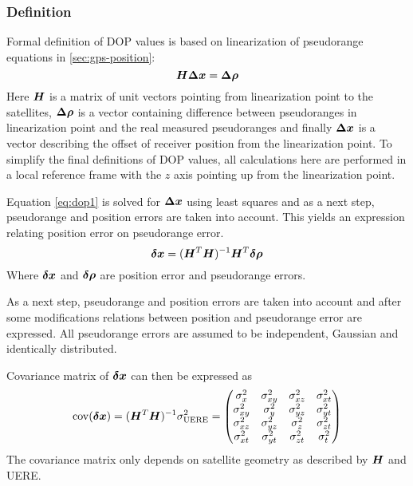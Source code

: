 \subsubsection{Definition}
Formal definition of DOP values is based on linearization of pseudorange equations
in \autoref{sec:gps-position}:
\begin{equation}
	\label{eq:dop1}
	\bm{H}\bm{\Delta x} = \bm{\Delta \rho}
\end{equation}
Here \(\bm{H}\) is a matrix of unit vectors pointing from linearization point
to the satellites, \(\bm{\Delta \rho}\) is a vector containing difference between
pseudoranges in linearization point and the real measured pseudoranges and finally
\(\bm{\Delta x}\) is a vector describing the offset of receiver position from the
linearization point.
To simplify the final definitions of DOP values, all calculations here are performed
in a local reference frame with the \(z\) axis pointing up from the linearization point.

Equation \eqref{eq:dop1} is solved for \(\bm{\Delta x}\) using least squares and
as a next step, pseudorange and position errors are taken into account.
This yields an expression relating position error on pseudorange error.
\begin{equation}
	\bm{\delta x} = (\bm{H}^T \bm{H})^{-1} \bm{H}^T \bm{\delta \rho}
\end{equation}
Where \(\bm{\delta x}\) and \(\bm{\delta \rho}\) are position error and pseudorange errors.

As a next step, pseudorange and position errors are taken into account and after
some modifications relations between position and pseudorange error are expressed.
All pseudorange errors are assumed to be independent, Gaussian and identically distributed.

Covariance matrix of \(\bm{\delta x}\) can then be expressed as
\begin{equation}
	\operatorname{\mathrm{cov}}(\bm{\delta x}) =
		(\bm{H}^T \bm{H})^{-1} \sigma^2_{\mathrm{UERE}} =
		\begin{pmatrix}
			\sigma^2_{x}  & \sigma^2_{xy} & \sigma^2_{xz} & \sigma^2_{xt} \\
			\sigma^2_{xy} & \sigma^2_{y}  & \sigma^2_{yz} & \sigma^2_{yt} \\
			\sigma^2_{xz} & \sigma^2_{yz} & \sigma^2_{z}  & \sigma^2_{zt} \\
			\sigma^2_{xt} & \sigma^2_{yt} & \sigma^2_{zt} & \sigma^2_{t}
		\end{pmatrix}
\end{equation}
The covariance matrix only depends on satellite geometry as described by \(\bm{H}\) and UERE.

